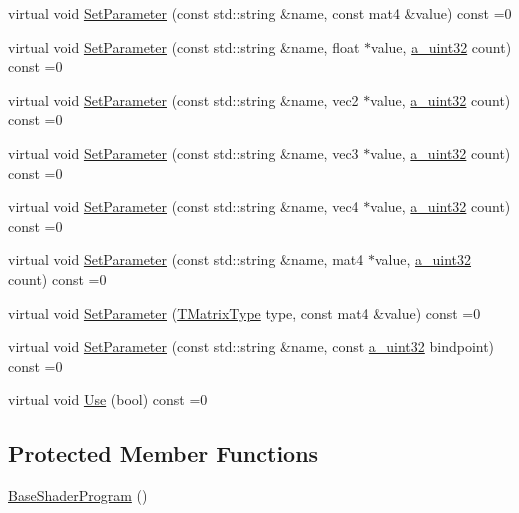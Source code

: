 \begin{DoxyCompactItemize}
virtual void \hyperlink{class_agmd_1_1_base_shader_program_a4e625ca495949cbc3de3390f167ba004}{Set\+Parameter} (const std\+::string \&name, const mat4 \&value) const =0
\item 
virtual void \hyperlink{class_agmd_1_1_base_shader_program_a71c97a8b14f618870399180e6854d41a}{Set\+Parameter} (const std\+::string \&name, float $\ast$value, \hyperlink{_common_defines_8h_a964296f9770051b9e4807b1f180dd416}{a\+\_\+uint32} count) const =0
\item 
virtual void \hyperlink{class_agmd_1_1_base_shader_program_a1236f2416f16faf3f1bbd498ae8f6130}{Set\+Parameter} (const std\+::string \&name, vec2 $\ast$value, \hyperlink{_common_defines_8h_a964296f9770051b9e4807b1f180dd416}{a\+\_\+uint32} count) const =0
\item 
virtual void \hyperlink{class_agmd_1_1_base_shader_program_a38bbbad0376d30d766206b3993af20d6}{Set\+Parameter} (const std\+::string \&name, vec3 $\ast$value, \hyperlink{_common_defines_8h_a964296f9770051b9e4807b1f180dd416}{a\+\_\+uint32} count) const =0
\item 
virtual void \hyperlink{class_agmd_1_1_base_shader_program_a61ba0324f392e6e615d24bd5754edc1f}{Set\+Parameter} (const std\+::string \&name, vec4 $\ast$value, \hyperlink{_common_defines_8h_a964296f9770051b9e4807b1f180dd416}{a\+\_\+uint32} count) const =0
\item 
virtual void \hyperlink{class_agmd_1_1_base_shader_program_a58f818f4f1c30d64eedfbf270c45ae22}{Set\+Parameter} (const std\+::string \&name, mat4 $\ast$value, \hyperlink{_common_defines_8h_a964296f9770051b9e4807b1f180dd416}{a\+\_\+uint32} count) const =0
\item 
virtual void \hyperlink{class_agmd_1_1_base_shader_program_a8dc439338afc188fb799c148c5a80f6d}{Set\+Parameter} (\hyperlink{namespace_agmd_aa7eba958a8a0e3ac4586f75298e122b1}{T\+Matrix\+Type} type, const mat4 \&value) const =0
\item 
virtual void \hyperlink{class_agmd_1_1_base_shader_program_a8fce978e7f8d453e2d3fe3333da0e425}{Set\+Parameter} (const std\+::string \&name, const \hyperlink{_common_defines_8h_a964296f9770051b9e4807b1f180dd416}{a\+\_\+uint32} bindpoint) const =0
\item 
virtual void \hyperlink{class_agmd_1_1_base_shader_program_a012143de4494c70afabb7a0eca867cd9}{Use} (bool) const =0
\end{DoxyCompactItemize}
\subsection*{Protected Member Functions}
\begin{DoxyCompactItemize}
\item 
\hyperlink{class_agmd_1_1_base_shader_program_a869e63682c9820d582ffccecbac785e6}{Base\+Shader\+Program} ()
\end{DoxyCompactItemize}
